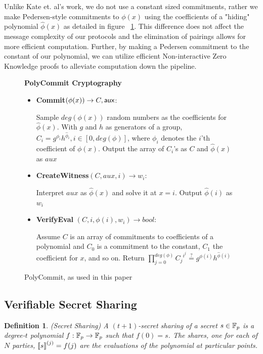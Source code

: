 \documentclass{sig-alternate-05-2015}
\newtheorem{definition}{Definition}
\begin{document}
Unlike Kate et. al's work, we do not use a constant sized commitments, rather we make Pedersen-style commitments to $\phi(x)$ using the coefficients of a "hiding" polynomial $\hat{\phi}(x)$ as detailed in figure ~\ref{polycommit}. This difference does not affect the message complexity of our protocols and the elimination of pairings allows for more efficient computation. Further, by making a Pedersen commitment to the constant of our polynomial, we can utilize efficient Non-interactive Zero Knowledge proofs to alleviate computation down the pipeline. 

\begin{figure}
  \vspace{10pt}
\begin{boxedminipage}{\columnwidth}
  {\centering \textbf{PolyCommit Cryptography} \\}
\begin{itemize}
\item \textbf{Commit}$( \phi(x) ) \rightarrow C,{\mathsf {aux}}$:

Sample $deg(\phi(x))$ random numbers as the coefficients for $\hat{\phi}(x)$. With $g$ and $h$ as generators of a group, $C_i = g^{\phi_i}h^{\hat{\phi}_i}, i\in [0,deg(\phi)]$, where $\phi_i$ denotes the $i$'th coefficient of $\phi(x)$. Output the array of $C_i$'s as $C$ and $\hat{\phi}(x)$ as $aux$

\item \textbf{CreateWitness}$(C, aux, i) \rightarrow w_i$:

Interpret $aux$ as $\hat{\phi}(x)$ and solve it at $x=i$. Output $\hat{\phi}(i)$ as $w_i$

\item \textbf{VerifyEval} $(C, i, \phi(i), w_i) \rightarrow bool$:

Assume $C$ is an array of commitments to coefficients of a polynomial and $C_0$ is a commitment to the constant, $C_1$ the coefficient for $x$, and so on.
Return $\prod_{j=0}^{deg(\phi)} {C_j}^{i^j} \overset{?}{=} g^{\phi(i)}h^{\hat{\phi}(i)}$

\end{itemize}
\end{boxedminipage}
\caption{PolyCommit, as used in this paper}
\label{polycommit}
\end{figure}

\subsection{Verifiable Secret Sharing}
\begin{definition} (Secret Sharing)
  A $(t+1)$-secret sharing of a secret $s \in {\ensuremath{\mathbb{F}_p}}$ is a degree-$t$ polynomial $f : {\mathbb{F}_p} \rightarrow {\ensuremath{\mathbb{F}_p}}$ such that $f(0) = s$. The shares, one for each of $N$ parties, ${ \llbracket {s} \rrbracket }^{(j)} = f(j)$ are the evaluations of the polynomial at particular points.
\end{definition}
\end{document}
